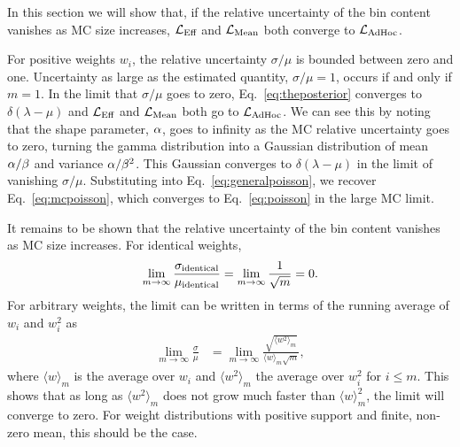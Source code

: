 In this section we will show that, if the relative uncertainty of the bin content vanishes as MC size increases, $\mathcal{L}_\textmd{Eff}$ and $\mathcal{L}_{\textmd{Mean}}$ both converge to $\mathcal{L}_{\textmd{AdHoc}}$.

For positive weights $w_i$, the relative uncertainty $\sigma/\mu$ is bounded between zero and one. Uncertainty as large as the estimated quantity, $\sigma/\mu=1$, occurs if and only if $m=1$. In the limit that $\sigma/\mu$ goes to zero, Eq.~\eqref{eq:theposterior} converges to $\delta(\lambda - \mu)$ and $\mathcal{L}_\textmd{Eff}$ and $\mathcal{L}_{\textmd{Mean}}$ both go to $\mathcal{L}_{\textmd{AdHoc}}$. We can see this by noting that the shape parameter, $\alpha$, goes to infinity as the MC relative uncertainty goes to zero, turning the gamma distribution into a Gaussian distribution of mean $\alpha / \beta$ and variance $\alpha / \beta^2$. This Gaussian converges to $\delta(\lambda-\mu)$ in the limit of vanishing $\sigma/\mu$. Substituting into Eq.~\eqref{eq:generalpoisson}, we recover Eq.~\eqref{eq:mcpoisson}, which converges to Eq.~\eqref{eq:poisson} in the large MC limit.

It remains to be shown that the relative uncertainty of the bin content vanishes as MC size increases. For identical weights,
\begin{equation}
\lim_{m\to\infty} \frac{\sigma_{\rm identical}}{\mu_{\rm identical}} = \lim_{m\to\infty} \frac{1}{\sqrt{m}} = 0 .
\end{equation}
For arbitrary weights, the limit can be written in terms of the running average of $w_i$ and $w_i^2$ as
\begin{align}
\lim_{m\to\infty} \frac{\sigma}{\mu} &= \lim_{m\to\infty} \frac{\sqrt{\langle w^2 \rangle_m}}{\langle w\rangle_m\sqrt{m}},
\end{align}
where $\langle w \rangle_m$ is the average over $w_i$ and $\langle w^2 \rangle_m$ the average over $w_i^2$ for $i \leq m$. This shows that as long as $\langle w^2 \rangle_m$ does not grow much faster than $\langle w \rangle_m^2$, the limit will converge to zero. For weight distributions with positive support and finite, non-zero mean, this should be the case.
